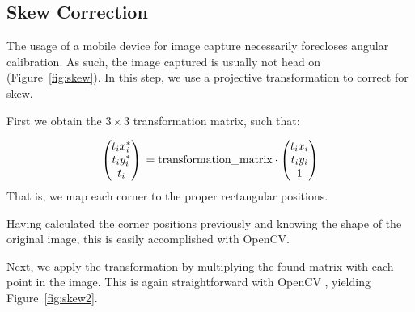 \documentclass[11pt, letterpaper]{article}
\begin{document}
\subsection{Skew Correction}
The usage of a mobile device for image capture necessarily forecloses angular calibration.
As such, the image captured is usually not head on (Figure~\ref{fig:skew}).
In this step, we use a projective transformation to correct for skew.

First we obtain the $3 \times 3$ transformation matrix, such that:

$$
\begin{pmatrix}
t_i x_i^*\\
t_i y_i^*\\
t_i
\end{pmatrix}\\
= \text{transformation\_matrix} \cdot
\begin{pmatrix}
t_i x_i\\
t_i y_i\\
1
\end{pmatrix}
$$
That is, we map each corner to the proper rectangular positions.

Having calculated the corner positions previously and knowing the shape of the original image, this is easily accomplished with OpenCV\cite{opencv_getperspectivetransform}.

Next, we apply the transformation by multiplying the found matrix with each point in the image.
This is again straightforward with OpenCV \cite{opencv_warpperspective}, yielding Figure~\ref{fig:skew2}.
\end{document}

